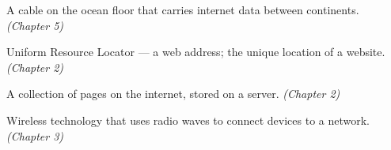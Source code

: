 \begin{tcolorbox}
\begin{description}[labelwidth=4cm, leftmargin=4.2cm, style=nextline, itemsep=0.45\baselineskip]
\item[\glossterm{Undersea cable}]
A cable on the ocean floor that carries internet data between continents.
\emph{(Chapter 5)}

\item[\glossterm{URL}]
Uniform Resource Locator — a web address; the unique location of a website.
\emph{(Chapter 2)}

\item[\glossterm{Website}]
A collection of pages on the internet, stored on a server.
\emph{(Chapter 2)}

\item[\glossterm{Wi-Fi}]
Wireless technology that uses radio waves to connect devices to a network.
\emph{(Chapter 3)}

\end{description}
\end{tcolorbox}
